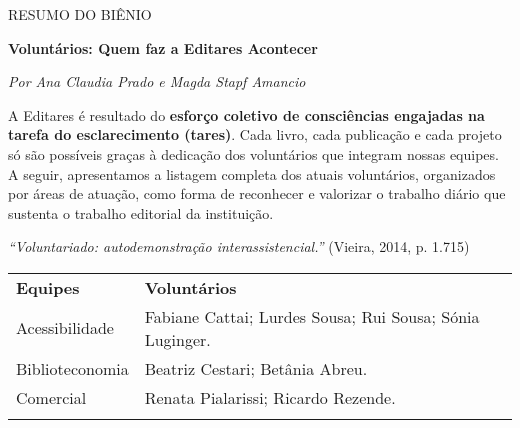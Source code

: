 RESUMO DO BIÊNIO

\textbf{Voluntários: Quem faz a Editares Acontecer}

\emph{Por Ana Claudia Prado e Magda Stapf Amancio}

A Editares é resultado do \textbf{esforço coletivo de consciências engajadas na tarefa do esclarecimento (tares)}. Cada livro, cada publicação e cada projeto só são possíveis graças à dedicação dos voluntários que integram nossas equipes. A seguir, apresentamos a listagem completa dos atuais voluntários, organizados por áreas de atuação, como forma de reconhecer e valorizar o trabalho diário que sustenta o trabalho editorial da instituição.

\emph{``Voluntariado: autodemonstração interassistencial.''} (Vieira, 2014, p. 1.715)

\begin{longtable}[]{@{}
  >{\raggedright\arraybackslash}p{}
  >{\raggedright\arraybackslash}p{}@{}}
\toprule\noalign{}
\begin{minipage}[b]{\linewidth}\centering
\textbf{Equipes}
\end{minipage} & \begin{minipage}[b]{\linewidth}\centering
\textbf{Voluntários}
\end{minipage} \\
\begin{minipage}[b]{\linewidth}\raggedright
Acessibilidade
\end{minipage} & \begin{minipage}[b]{\linewidth}\raggedright
Fabiane Cattai; Lurdes Sousa; Rui Sousa; Sónia Luginger.
\end{minipage} \\
\begin{minipage}[b]{\linewidth}\raggedright
Biblioteconomia
\end{minipage} & \begin{minipage}[b]{\linewidth}\raggedright
Beatriz Cestari; Betânia Abreu.
\end{minipage} \\
\begin{minipage}[b]{\linewidth}\raggedright
Comercial
\end{minipage} & \begin{minipage}[b]{\linewidth}\raggedright
Renata Pialarissi; Ricardo Rezende.
\end{minipage} \\
\begin{minipage}[b]{\linewidth}\raggedright

\end{minipage}
\end{longtable}
